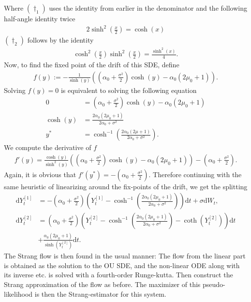 Where $(\dagger_1)$ uses the identity from earlier in the denominator and the following half-angle identity twice
\begin{align*}
    2\sinh^2\left(\frac{x}{2}\right) = \cosh(x)
\end{align*}
$(\dagger_2)$ follows by the identity
\begin{align*}
    \cosh^2\left(\frac{x}{2}\right)\sinh^2\left(\frac{x}{2}\right) = \frac{\sinh^2(x)}{4}.
\end{align*}
Now, to find the fixed point of the drift of this SDE, define 
\begin{align}
    f(y) :=  -\frac{1}{\sinh(y)}\left(\left(\alpha_0 + \frac{\sigma^2}{2}\right)\cosh(y) - \alpha_0\left(2\mu_0 + 1\right)\right).
\end{align}
Solving $f(y) = 0$ is equivalent to solving the following equation
\begin{align}
    0 &= \left(\alpha_0 + \frac{\sigma^2}{2}\right)\cosh(y) - \alpha_0\left(2\mu_0 + 1\right) \nonumber \\
    \cosh(y) &= \frac{2\alpha_0\left(2\mu_0 + 1\right)}{2\alpha_0 + \sigma^2} \nonumber\\
    y^* &= \cosh^{-1}\left(\frac{2\alpha_0\left(2\mu + 1\right)}{2\alpha_0 + \sigma^2}\right).
\end{align}
We compute the derivative of $f$
\begin{align}
    f'(y) = \frac{\cosh(y)}{\sinh^2(y)}\left(\left(\alpha_0 + \frac{\sigma^2}{2}\right)\cosh(y) - \alpha_0\left(2\mu_0 + 1\right)\right) - \left(\alpha_0 + \frac{\sigma^2}{2}\right).
\end{align}
Again, it is obvious that $f'(y^*) = - \left(\alpha_0 + \frac{\sigma^2}{2}\right)$.
Therefore continuing with the same heuristic of linearizing around the fix-points of the drift, we get the splitting
\begin{align}
    \mathrm{d}Y_t^{[1]} &= -\left(\alpha_0 + \frac{\sigma^2}{2}\right)\left(Y_t^{[1]} - \cosh^{-1}\left(\frac{2\alpha_0\left(2\mu_0 + 1\right)}{2\alpha_0 + \sigma^2}\right)\right)\mathrm{d}t + \sigma \mathrm{d}W_t, \\
    \mathrm{d}Y_t^{[2]} &= \left(\alpha_0 + \frac{\sigma^2}{2}\right) \left(Y_t^{[2]} - \cosh^{-1}\left(\frac{2\alpha_0\left(2\mu_0 + 1\right)}{2\alpha_0 + \sigma^2}\right) - \coth\left(Y_t^{[2]}\right) \right)\mathrm{d}t\nonumber\\
    &+ \frac{\alpha_0\left(2\mu_0 + 1\right)}{\sinh(Y_t^{[2]})}\mathrm{d}t. \label{eq:scaledFStrang}
\end{align}
The Strang flow is then found in the usual manner: The flow from the linear part is obtained as the solution to the OU SDE, and the non-linear ODE along with its inverse etc. is solved with a fourth-order Runge-kutta. Then construct the Strang approximation of the flow as before. The maximizer of this pseudo-likelihood is then the Strang-estimator for this system.  
